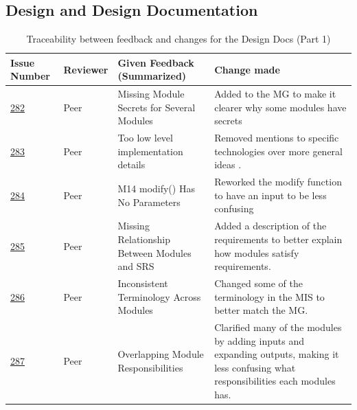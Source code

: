 \documentclass{article}
\begin{document}
\subsection{Design and Design Documentation}

\begin{table}[H]
\centering
\begin{tabularx}{\textwidth}{p{1.3cm} l X X}
\toprule
Issue Number & Reviewer & Given Feedback (Summarized) & Change made  \\
\midrule
\href{https://github.com/ritual-17/flow/issues/282}{282} & Peer &  Missing Module Secrets for Several Modules & Added to the MG to make it clearer why some modules have secrets\\

\href{https://github.com/ritual-17/flow/issues/283}{283} & Peer & Too low level implementation details & Removed mentions to specific technologies over more general ideas
.\\

\href{https://github.com/ritual-17/flow/issues/284}{284} & Peer & M14 modify() Has No Parameters
& Reworked the modify function to have an input to be less confusing \\

\href{https://github.com/ritual-17/flow/issues/285}{285} & Peer & Missing Relationship Between Modules and SRS & Added a description of the requirements to better explain how modules satisfy requirements.\\

\href{https://github.com/ritual-17/flow/issues/286}{286} & Peer & Inconsistent Terminology Across Modules & Changed some of the terminology in the MIS to better match the MG. \\

\href{https://github.com/ritual-17/flow/issues/287}{287} & Peer & Overlapping Module Responsibilities & Clarified many of the modules by adding inputs and expanding outputs, making it less confusing what responsibilities each modules has.\\

\bottomrule
\end{tabularx}
\caption{Traceability between feedback and changes for the Design Docs (Part 1)}
\end{table}
\end{document}
